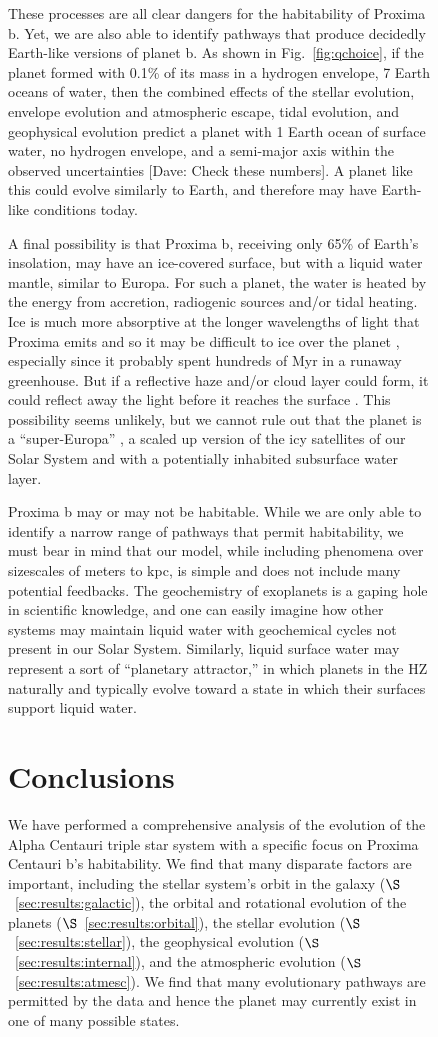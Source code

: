 \documentclass[preprint,12pt]{aastex}
\newcommand{\xxx}[1]{{\color{red} #1}} %
\def\eg{{\it e.g.\ }}
\begin{document}
\begin{figure}
{These processes are all clear dangers for the habitability of Proxima
b. Yet, we are also able to identify pathways that produce decidedly
Earth-like versions of planet b. \xxx{As shown in Fig.~\ref{fig:qchoice},
if the planet formed with 0.1\% of its mass in a hydrogen envelope, 7
Earth oceans of water, then the combined effects of the stellar
evolution, envelope evolution and atmospheric escape, tidal evolution,
and geophysical evolution predict a planet with 1 Earth ocean of
surface water, no hydrogen envelope, and a semi-major axis within the
observed uncertainties [Dave: Check these numbers]}. A planet like this could evolve similarly to
Earth, and therefore may have Earth-like conditions today.

A final possibility is that Proxima b, receiving only 65\% of Earth's
insolation, may have an ice-covered surface, but with a liquid water
mantle, similar to Europa. For such a planet, the water is heated by
the energy from accretion, radiogenic sources and/or tidal
heating. Ice is much more absorptive at the longer wavelengths of
light that Proxima emits and so it may be difficult to ice over the
planet \citep{JoshiHaberle12,Shields13}, especially since it probably spent
hundreds of Myr in a runaway greenhouse. But if a reflective haze
and/or cloud layer could form, it could reflect away the light before
it reaches the surface \citep[\eg][]{Arney16}. This possibility seems unlikely, but we cannot
rule out that the planet is a ``super-Europa'' \citep{BarnesHeller13},
a scaled up version of the icy satellites of our Solar System and with
a potentially inhabited subsurface water layer.

Proxima b may or may not be habitable. While we are only able to
identify a narrow range of pathways that permit habitability, we must
bear in mind that our model, while including phenomena over sizescales
of meters to kpc, is simple and does not include many potential
feedbacks. The geochemistry of exoplanets is a gaping hole in
scientific knowledge, and one can easily imagine how other systems may
maintain liquid water with geochemical cycles not present in our Solar
System. Similarly, liquid surface water may represent a sort of
``planetary attractor,'' in which planets in the HZ naturally and
typically evolve toward a state in which their surfaces support liquid
water.

\section{Conclusions\label{sec:concl}}
We have performed a comprehensive analysis of the evolution of the
Alpha Centauri triple star system with a specific focus on Proxima Centauri b's
habitability. We find that many disparate factors are important,
including the stellar system's orbit in the galaxy
($\S$~\ref{sec:results:galactic}), the orbital and rotational evolution of
the planets ($\S$~\ref{sec:results:orbital}), the stellar evolution
($\S$~\ref{sec:results:stellar}), the geophysical evolution
($\S$~\ref{sec:results:internal}), and the atmospheric evolution
($\S$~\ref{sec:results:atmesc}). We find that many evolutionary pathways
are permitted by the data and hence the planet may currently exist in
one of many possible states.

}
\end{figure}
\end{document}
